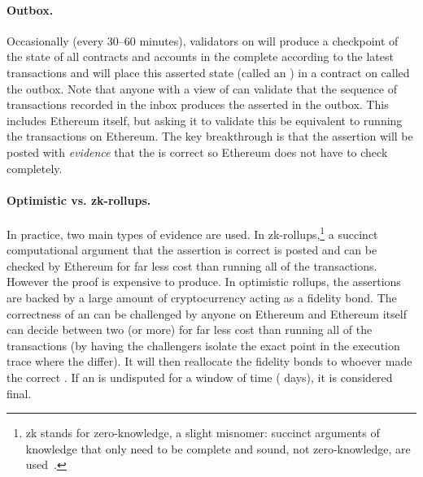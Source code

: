 \paragraph{Outbox.} Occasionally (\eg every 30--60 minutes), validators on \layertwo will produce a checkpoint of the state of all contracts and accounts in the complete \layertwo according to the latest transactions and will place this asserted state (called an \rblock) in a contract on \layerone called the outbox. Note that anyone with a view of \layerone can validate that the sequence of transactions recorded in the inbox produces the asserted \rblock in the outbox. This includes Ethereum itself, but asking it to validate this be equivalent to running the transactions on Ethereum. The key breakthrough is that the assertion will be posted with \textit{evidence} that the \rblock is correct so Ethereum does not have to check completely.

\paragraph{Optimistic vs. zk-rollups.} In practice, two main types of evidence are used. In zk-rollups,\footnote{zk stands for zero-knowledge, a slight misnomer: succinct arguments of knowledge that only need to be complete and sound, not zero-knowledge, are used~\cite{Mei21}.} a succinct computational argument that the assertion is correct is posted and can be checked by Ethereum for far less cost than running all of the transactions. However the proof is expensive to produce. In optimistic rollups, the assertions are backed by a large amount of cryptocurrency acting as a fidelity bond. The correctness of an \rblock can be challenged by anyone on Ethereum and Ethereum itself can decide between two (or more) \rblocks for far less cost than running all of the transactions (by having the challengers isolate the exact point in the execution trace where the \rblocks differ). It will then reallocate the fidelity bonds to whoever made the correct \rblock. If an \rblock is undisputed for a window of time ( days), it is considered final.

